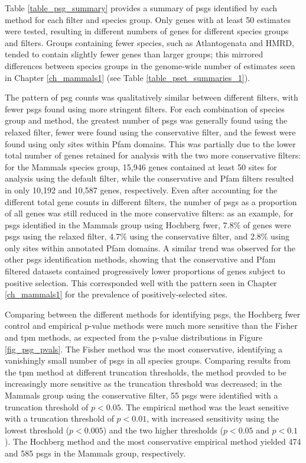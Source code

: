 Table \ref{table_psg_summary} provides a summary of \acp{psg}
identified by each method for each \sw filter and species group. Only
genes with at least 50 \sw estimates were tested, resulting in
different numbers of genes for different species groups and \sw
filters. Groups containing fewer species, such as Atlantogenata and
HMRD, tended to contain slightly fewer genes than larger groups; this
mirrored differences between species groups in the genome-wide number
of \sw estimates seen in Chapter \ref{ch_mammals1} (see Table
\ref{table_pset_summaries_1}).

The pattern of \ac{psg} counts was qualitatively similar between
different \sw filters, with fewer \acp{psg} found using more stringent
filters. For each combination of species group and method, the
greatest number of \acp{psg} was generally found using the relaxed
filter, fewer were found using the conservative filter, and the fewest
were found using only sites within Pfam domains. This was partially
due to the lower total number of genes retained for analysis with the
two more conservative filters: for the Mammals species group, 15,946
genes contained at least 50 sites for analysis using the default
filter, while the conservative and Pfam filters resulted in only
10,192 and 10,587 genes, respectively. Even after accounting for the
different total gene counts in different filters, the number of
\acp{psg} as a proportion of all genes was still reduced in the more
conservative filters: as an example, for \acp{psg} identified in the
Mammals group using Hochberg \ac{fwer}, 7.8\% of genes were \acp{psg}
using the relaxed filter, 4.7\% using the conservative filter, and
2.8\% using only sites within annotated Pfam domains. A similar trend
was observed for the other \acp{psg} identification methods, showing
that the conservative and Pfam filtered datasets contained
progressively lower proportions of genes subject to positive
selection. This corresponded well with the pattern seen in Chapter
\ref{ch_mammals1} for the prevalence of positively-selected sites.

Comparing between the different methods for identifying \acp{psg}, the
Hochberg \ac{fwer} control and empirical p-value methods were much
more sensitive than the Fisher and \ac{tpm} methods, as expected from
the p-value distributions in Figure \ref{fig_psg_pvals}. The Fisher
method was the most conservative, identifying a vanishingly small
number of \acp{psg} in all species groups. Comparing results from the
\ac{tpm} method at different truncation thresholds, the method provded
to be increasingly more sensitive as the truncation threshold was
decreased; in the Mammals group using the conservative filter, 55
\acp{psg} were identified with a truncation threshold of $p<0.05$. The
empirical method was the least sensitive with a truncation threshold
of $p<0.01$, with increased sensitivity using the lowest threshold
($p<0.005$) and the two higher thresholds ($p<0.05$ and $p<0.1$). The
Hochberg method and the most conservative empirical method yielded 474
and 585 \acp{psg} in the Mammals group, respectively.


